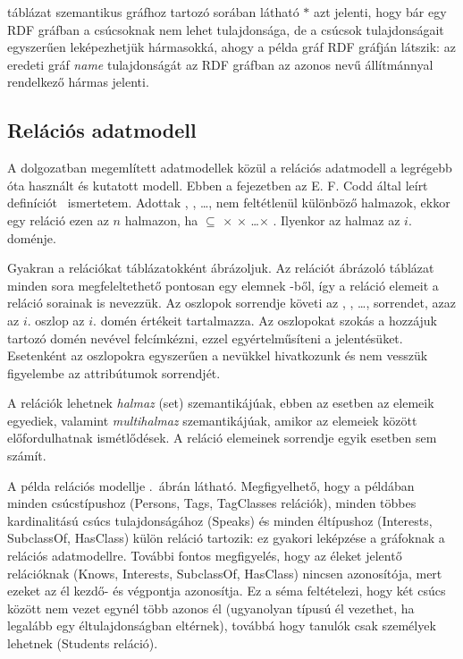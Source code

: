  táblázat szemantikus gráfhoz tartozó sorában látható $*$ azt jelenti, hogy bár egy RDF gráfban a csúcsoknak nem lehet tulajdonsága, de a csúcsok tulajdonságait egyszerűen leképezhetjük hármasokká, ahogy a példa gráf RDF gráfján látszik: az eredeti gráf \textit{name} tulajdonságát az RDF gráfban az azonos nevű állítmánnyal rendelkező hármas jelenti.

\subsection{Relációs adatmodell}
\label{sec:relacios-adatmodell}

A dolgozatban megemlített adatmodellek közül a relációs adatmodell a legrégebb óta használt és kutatott modell. Ebben a fejezetben az E. F. Codd által leírt definíciót~\cite{DBLP:journals/cacm/Codd70} ismertetem.
Adottak , , \dots,  nem feltétlenül különböző halmazok, ekkor \rel{} egy reláció ezen az $n$ halmazon, ha \rel{} $\subseteq{}$  $\times$  $\times$ \dots $\times$ . Ilyenkor az  halmaz az \rel{} $i.$ doménje.

Gyakran a relációkat táblázatokként ábrázoljuk. Az \rel{} relációt ábrázoló táblázat minden sora megfeleltethető pontosan egy elemnek \rel{}-ből, így a reláció elemeit a reláció sorainak is nevezzük.
Az oszlopok sorrendje követi az , , \dots,  sorrendet, azaz az $i.$ oszlop az $i.$ domén értékeit tartalmazza. Az oszlopokat szokás a hozzájuk tartozó domén nevével felcímkézni, ezzel egyértelműsíteni a jelentésüket. Esetenként az oszlopokra egyszerűen a nevükkel hivatkozunk és nem vesszük figyelembe az attribútumok sorrendjét.

A relációk lehetnek \emph{halmaz} (set) szemantikájúak, ebben az esetben az elemeik egyediek, valamint \emph{multihalmaz} szemantikájúak, amikor az elemeiek között előfordulhatnak ismétlődések. A reláció elemeinek sorrendje egyik esetben sem számít.

A példa relációs modellje .~ábrán látható. Megfigyelhető, hogy a példában minden csúcstípushoz (\textsf{Persons}, \textsf{Tags}, \textsf{TagClasses} relációk), minden többes kardinalitású csúcs tulajdonságához (\textsf{Speaks}) és minden éltípushoz (\textsf{Interests}, \textsf{SubclassOf}, \textsf{HasClass}) külön reláció tartozik: ez gyakori leképzése a gráfoknak a relációs adatmodellre. További fontos megfigyelés, hogy az éleket jelentő relációknak (\textsf{Knows}, \textsf{Interests}, \textsf{SubclassOf}, \textsf{HasClass}) nincsen azonosítója, mert ezeket az él kezdő- és végpontja azonosítja. Ez a séma feltételezi, hogy két csúcs között nem vezet egynél több azonos él (ugyanolyan típusú él vezethet, ha legalább egy éltulajdonságban eltérnek), továbbá hogy tanulók csak személyek lehetnek (\textsf{Students} reláció).

